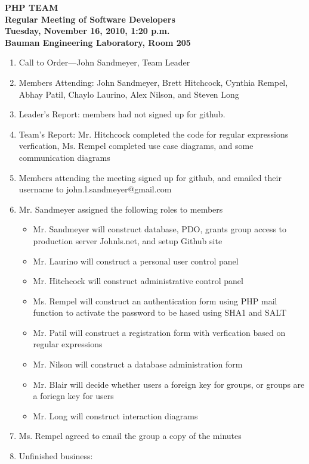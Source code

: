 \documentclass[12pt, oneside, letterpaper]{article}
\begin{document}
\begin{center}
\textbf{
PHP TEAM \\
Regular Meeting of Software Developers \\
Tuesday, November 16, 2010, 1:20 p.m. \\
Bauman Engineering Laboratory, Room 205 \\
}
\end{center}
\begin{enumerate}
\rightmargin=0pt
\item{Call to Order---John Sandmeyer, Team Leader}
\item{Members Attending: John Sandmeyer, Brett Hitchcock, Cynthia Rempel, Abhay Patil, Chaylo Laurino, Alex Nilson, and Steven Long}
\item{Leader's Report: members had not signed up for github.}
\item{Team's Report: Mr. Hitchcock completed the code for regular expressions verfication, Ms. Rempel completed use case diagrams, and some communication diagrams}
\item{Members attending the meeting signed up for github, and emailed their username to john.l.sandmeyer@gmail.com}
\item{Mr. Sandmeyer assigned the following roles to members}
\begin{itemize}
\item Mr. Sandmeyer will construct database, PDO, grants group access to production server Johnls.net, and setup Github site
\item Mr. Laurino will construct a personal user control panel
\item Mr. Hitchcock will construct administrative control panel
\item Ms. Rempel will construct an authentication form using PHP mail function to activate the password to be hased using SHA1 and SALT
\item Mr. Patil will construct a registration form with verfication based on regular expressions
\item Mr. Nilson will construct a database administration form
\item Mr. Blair will decide whether users a foreign key for groups, or groups are a foriegn key for users
\item Mr. Long will construct interaction diagrams
\end{itemize}
\item{Ms. Rempel agreed to email the group a copy of the minutes}
\item{Unfinished business:}

\end{enumerate}
\end{document}
